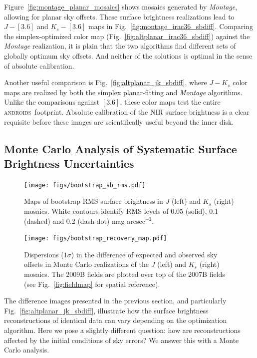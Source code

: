 \documentclass[iop]{emulateapj}
\newcommand{\sw}[1]{\textit{#1}} %
\newcommand{\androids}{\textsc{androids}}
\newcommand{\Fig}[1]{Fig.~\ref{fig:#1}}  %
\begin{document}
Figure~\ref{fig:montage_planar_mosaics} shows mosaics generated by \sw{Montage}, allowing for planar sky offsets.
These surface brightness realizations lead to $J-[3.6]$ and $K_s-[3.6]$ maps in \Fig{montage_irac36_sbdiff}.
Comparing the simplex-optimized color map (\Fig{altplanar_irac36_sbdiff}) against the \sw{Montage} realization, it is plain that the two algorithms find different sets of globally optimum sky offsets.
And neither of the solutions is optimal in the sense of absolute calibration.

Another useful comparison is \Fig{altplanar_jk_sbdiff}, where $J-K_s$ color maps are realized by both the simplex planar-fitting and \sw{Montage} algorithms.
Unlike the comparisons against $[3.6]$, these color maps test the entire \androids\ footprint.
Absolute calibration of the NIR surface brightness is a clear requisite before these images are scientifically useful beyond the inner disk.

\subsection{Monte Carlo Analysis of Systematic Surface Brightness Uncertainties}

\begin{figure}[t]
\centering
\texttt{[image: figs/bootstrap\_sb\_rms.pdf]}
\caption{Maps of bootstrap RMS surface brightness in $J$ (left) and $K_s$ (right) mosaics.
White contours identify RMS levels of 0.05 (solid), 0.1 (dashed) and 0.2 (dash-dot) mag arcsec$^{-2}$.}
\label{fig:bootstrap_sb_rms}
\end{figure}

\begin{figure}[t]
\centering
\texttt{[image: figs/bootstrap\_recovery\_map.pdf]}
\caption{Dispersions ($1\sigma$) in the difference of expected and observed sky offsets in Monte Carlo realizations of the $J$ (left) and $K_s$ (right) mosaics.
The 2009B fields are plotted over top of the 2007B fields (see \Fig{fieldmap} for spatial reference).}
\label{fig:bootstrap_recovery_map}
\end{figure}


The difference images presented in the previous section, and particularly \Fig{altplanar_jk_sbdiff}, illustrate how the surface brightness reconstructions of identical data can vary depending on the optimization algorithm.
Here we pose a slightly different question: how are reconstructions affected by the initial conditions of sky errors? We answer this with a Monte Carlo analysis.
\end{document}
